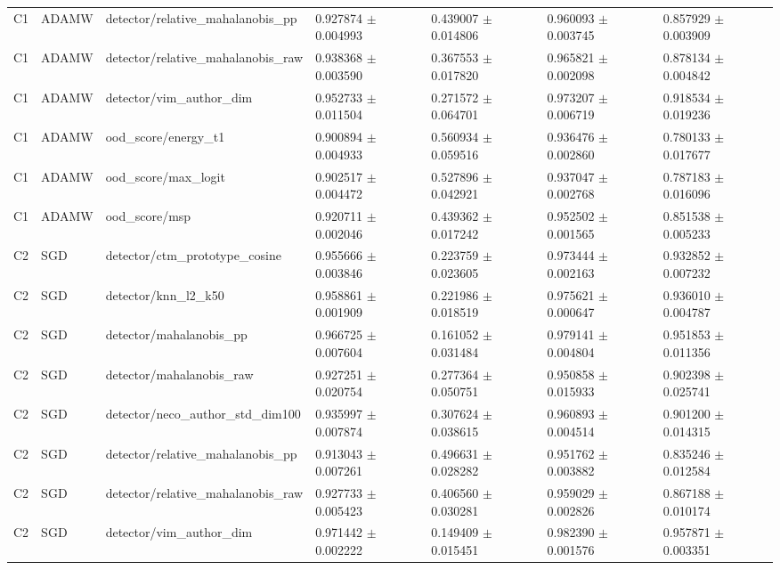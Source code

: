 \begin{longtable}{lllllll}
C1 & ADAMW & detector/relative\_mahalanobis\_pp & 0.927874 $\pm$ 0.004993 & 0.439007 $\pm$ 0.014806 & 0.960093 $\pm$ 0.003745 & 0.857929 $\pm$ 0.003909 \\
C1 & ADAMW & detector/relative\_mahalanobis\_raw & 0.938368 $\pm$ 0.003590 & 0.367553 $\pm$ 0.017820 & 0.965821 $\pm$ 0.002098 & 0.878134 $\pm$ 0.004842 \\
C1 & ADAMW & detector/vim\_author\_dim & 0.952733 $\pm$ 0.011504 & 0.271572 $\pm$ 0.064701 & 0.973207 $\pm$ 0.006719 & 0.918534 $\pm$ 0.019236 \\
C1 & ADAMW & ood\_score/energy\_t1 & 0.900894 $\pm$ 0.004933 & 0.560934 $\pm$ 0.059516 & 0.936476 $\pm$ 0.002860 & 0.780133 $\pm$ 0.017677 \\
C1 & ADAMW & ood\_score/max\_logit & 0.902517 $\pm$ 0.004472 & 0.527896 $\pm$ 0.042921 & 0.937047 $\pm$ 0.002768 & 0.787183 $\pm$ 0.016096 \\
C1 & ADAMW & ood\_score/msp & 0.920711 $\pm$ 0.002046 & 0.439362 $\pm$ 0.017242 & 0.952502 $\pm$ 0.001565 & 0.851538 $\pm$ 0.005233 \\
C2 & SGD & detector/ctm\_prototype\_cosine & 0.955666 $\pm$ 0.003846 & 0.223759 $\pm$ 0.023605 & 0.973444 $\pm$ 0.002163 & 0.932852 $\pm$ 0.007232 \\
C2 & SGD & detector/knn\_l2\_k50 & 0.958861 $\pm$ 0.001909 & 0.221986 $\pm$ 0.018519 & 0.975621 $\pm$ 0.000647 & 0.936010 $\pm$ 0.004787 \\
C2 & SGD & detector/mahalanobis\_pp & 0.966725 $\pm$ 0.007604 & 0.161052 $\pm$ 0.031484 & 0.979141 $\pm$ 0.004804 & 0.951853 $\pm$ 0.011356 \\
C2 & SGD & detector/mahalanobis\_raw & 0.927251 $\pm$ 0.020754 & 0.277364 $\pm$ 0.050751 & 0.950858 $\pm$ 0.015933 & 0.902398 $\pm$ 0.025741 \\
C2 & SGD & detector/neco\_author\_std\_dim100 & 0.935997 $\pm$ 0.007874 & 0.307624 $\pm$ 0.038615 & 0.960893 $\pm$ 0.004514 & 0.901200 $\pm$ 0.014315 \\
C2 & SGD & detector/relative\_mahalanobis\_pp & 0.913043 $\pm$ 0.007261 & 0.496631 $\pm$ 0.028282 & 0.951762 $\pm$ 0.003882 & 0.835246 $\pm$ 0.012584 \\
C2 & SGD & detector/relative\_mahalanobis\_raw & 0.927733 $\pm$ 0.005423 & 0.406560 $\pm$ 0.030281 & 0.959029 $\pm$ 0.002826 & 0.867188 $\pm$ 0.010174 \\
C2 & SGD & detector/vim\_author\_dim & 0.971442 $\pm$ 0.002222 & 0.149409 $\pm$ 0.015451 & 0.982390 $\pm$ 0.001576 & 0.957871 $\pm$ 0.003351 \\

\end{longtable}
